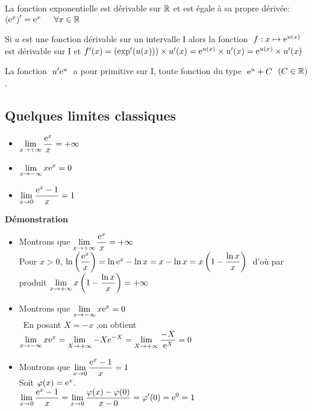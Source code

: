\begin{property}
 La fonction exponentielle est dérivable sur $ \mathbb{R} $ et est égale à sa propre dérivée:
 $ \left( \mathrm{e}^{x}\right)^{\prime}=\mathrm{e}^{x}\;\;  \quad \forall x \in \mathbb{R} $
\end{property}
\begin{corollary}
Si $u$ est une fonction  dérivable sur un intervalle I alors la fonction $\; f: x \mapsto \mathrm{e}^{u(x)} \;$  est dérivable sur I  et  $ f'(x)=\left(\text{exp}^{\prime}(u(x))\right)\times u'(x) = \mathrm{e}^{u(x)}\times u'(x)=\mathrm{e}^{u(x)}\times u'(x)$ 

\end{corollary}

 La fonction  $\;  u^{\prime}\mathrm{e}^{u} \;$  a pour primitive   sur I, toute fonction du type  $\;  \mathrm{e}^{u}+C \; $ $ (C\in\mathbb{R}) $.
 


\subsection{ Quelques limites classiques}

\begin{property}
\begin{itemize}
\item  $\displaystyle \lim_{x \to +\infty}\dfrac{\mathrm{e}^{x}}{x}=+\infty $
\item  $\displaystyle \lim_{x \to -\infty} x\mathrm{e}^{x}=0 $   
\item  $\displaystyle \lim_{x \to 0} \dfrac{\mathrm{e}^{x}-1}{x}=1 $
\end{itemize}
\end{property}


\textbf{Démonstration}
\begin{itemize}
\item   Montrons que $ \displaystyle\lim_{x \to +\infty}\dfrac{\mathrm{e}^{x}}{x}=+\infty $ \\  
 Pour $ x > 0 $,\; $ \ln  \left(\dfrac{\mathrm{e}^{x}}{x}\right)  =\ln \mathrm{e}^{x}-\ln x  =x-\ln x  =x\left(1-\dfrac{\ln x}{x}\right)\; $   d'où par produit  $\displaystyle \lim_{x \to +\infty}x\left(1-\dfrac{\ln x}{x}\right)=+\infty $
 
 \item   Montrons que\; $ \displaystyle\lim_{x \to -\infty}x\mathrm{e}^{x}=0 $ \\\ 
 En posant $ X=-x $ ,\;on obtient $\displaystyle \lim_{x \to -\infty}x\mathrm{e}^{x}=\lim_{X \to +\infty}-X\mathrm{e}^{-X} = \displaystyle\lim_{X \to +\infty}\dfrac{-X}{\mathrm{e}^{X}}=0$ 
 \item  Montrons que\; $ \displaystyle\lim_{x \to 0} \dfrac{\mathrm{e}^{x}-1}{x}=1 $\\
  Soit $ \varphi (x)=\mathrm{e}^{x}$.\\
  $\displaystyle \lim_{x \to 0}  \dfrac{\mathrm{e}^{x}-1}{x} =\displaystyle\lim_{x \to 0}  \dfrac{\varphi(x)-\varphi(0)}{x-0} = \varphi'(0)=\mathrm{e}^{0}=1$
  \end{itemize}





